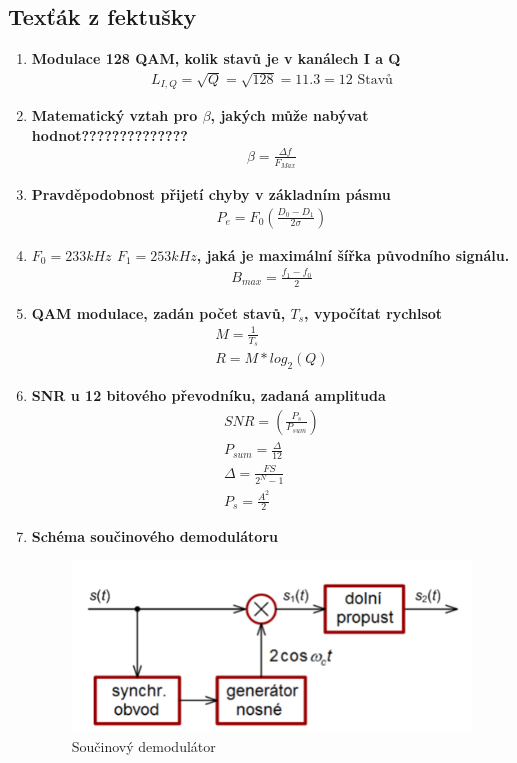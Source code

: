 \subsection{Texťák z fektušky}
\begin{enumerate}
    \item \textbf{Modulace 128 QAM, kolik stavů je v kanálech I a Q}
    \begin{gather*}
        L_{I,Q}=\sqrt{Q}=\sqrt{128}=11.3= 12\textrm{ Stavů}
    \end{gather*}

    \item \textbf{Matematický vztah pro $\beta$, jakých může nabývat hodnot?????????????? }
    \begin{gather*}
        \beta=\frac{\Delta f}{F_{Max}}
    \end{gather*}
    \item \textbf{Pravděpodobnost přijetí chyby v základním pásmu}
    \begin{gather*}
        P_e=F_0(\frac{D_0-D_1}{2\sigma})
    \end{gather*}
    \item \textbf{$F_0=233kHz$ $F_1=253 kHz$, jaká je maximální šířka původního signálu.}
    \begin{gather*}
        B_{max}=\frac{f_1-f_0}{2}
    \end{gather*}
    
    \item \textbf{QAM modulace, zadán počet stavů, $T_s$, vypočítat rychlsot}
    \begin{gather*}
        M=\frac{1}{T_s} \\
        R=M*log_2(Q) 
    \end{gather*}
    \item \textbf{SNR u 12 bitového převodníku, zadaná amplituda}
    \begin{gather*}
        SNR=(\frac{P_s}{P_{sum}})\\
        P_{sum}=\frac{\Delta}{12}\\
        \Delta=\frac{FS}{2^N-1}\\
        P_s=\frac{A^2}{2}
    \end{gather*}
    \item \textbf{Schéma součinového demodulátoru}
    \begin{figure}[h!]
        \centering
        \includegraphics[width=0.5\linewidth]{images/soucindemod.png}
        \caption{Součinový demodulátor}
        \label{fig:enter-label}
    \end{figure}


\end{enumerate}

